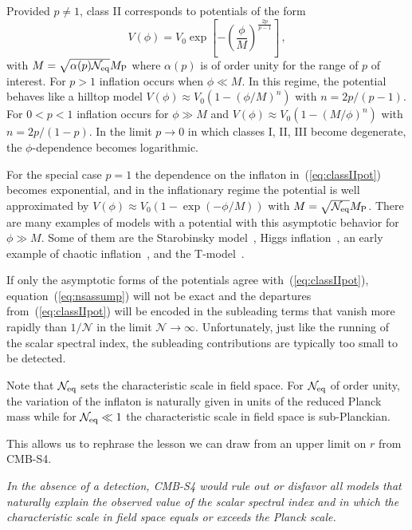 Provided $p\neq 1$, class II corresponds to potentials of the form 
\begin{equation}\label{eq:classIIpot}
V(\phi)=V_0\exp\left[-\left(\frac{\phi}{M}\right)^{\frac{2p}{p-1}}\right]\,,
\end{equation}
with $M=\sqrt{\alpha(p)\mathcal{N}_{\rm eq}}M_{\rm P}$ where $\alpha(p)$ is of order unity for the range of $p$ of interest. For $p>1$ inflation occurs when $\phi\ll M$. In this regime, the potential behaves like a hilltop model $V(\phi)\approx V_0(1-\left(\phi/M\right)^n)$ with $n=2p/(p-1)$. For $0<p<1$ inflation occurs for $\phi\gg M$ and $V(\phi)\approx V_0(1-\left(M/\phi\right)^n)$ with $n=2p/(1-p)$. In the limit $p\to0$ in which classes I, II, III become degenerate, the $\phi$-dependence becomes logarithmic. 

For the special case $p=1$ the dependence on the inflaton in~(\ref{eq:classIIpot}) becomes exponential, and in the inflationary regime the potential is well approximated by $V(\phi)\approx V_0\left(1-\exp\left(-\phi/M\right)\right)$ with $M=\sqrt{\mathcal{N}_{\rm eq}}M_{\rm P}$. There are many examples of models with a potential with this asymptotic behavior for $\phi\gg M$. Some of them are the Starobinsky model~\cite{Starobinsky:1980te}, Higgs inflation~\cite{Salopek:1988qh,Bezrukov:2007ep}, an early example of chaotic inflation~\cite{Goncharov:1983mw}, and the T-model~\cite{Kallosh:2013hoa}.

If only the asymptotic forms of the potentials agree with~(\ref{eq:classIIpot}), equation~(\ref{eq:nsassump}) will not be exact and the departures from~(\ref{eq:classIIpot}) will be encoded in the subleading terms that vanish more rapidly than $1/\mathcal{N}$ in the limit $\mathcal{N}\to\infty$. Unfortunately, just like the running of the scalar spectral index, the subleading contributions are typically too small to be detected.

Note that $\mathcal{N}_{\rm eq}$ sets the characteristic scale in field space. For $\mathcal{N}_{\rm eq}$ of order unity, the variation of the inflaton is naturally given in units of the reduced Planck mass while for $\mathcal{N}_{\rm eq}\ll 1$ the characteristic scale in field space is sub-Planckian. 

This allows us to rephrase the lesson we can draw from an upper limit on $r$ from CMB-S4.

{\em In the absence of a detection, CMB-S4 would rule out or disfavor all models that naturally explain the observed value of the scalar spectral index and in which the characteristic scale in field space equals or exceeds the Planck scale.}

